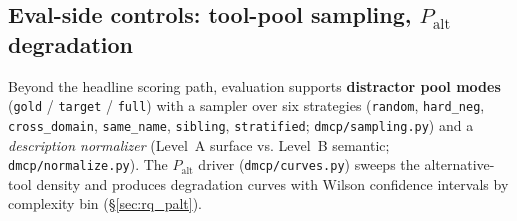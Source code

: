 \subsection{Eval-side controls: tool-pool sampling, $P_{\text{alt}}$ degradation}
\label{sec:method:controls}

Beyond the headline scoring path, evaluation supports \textbf{distractor
pool modes} (\texttt{gold} / \texttt{target} / \texttt{full}) with a
sampler over six strategies (\texttt{random}, \texttt{hard\_neg},
\texttt{cross\_domain}, \texttt{same\_name}, \texttt{sibling},
\texttt{stratified}; \texttt{dmcp/sampling.py}) and a \emph{description
normalizer} (Level~A surface vs. Level~B semantic;
\texttt{dmcp/normalize.py}). The $P_{\text{alt}}$ driver
(\texttt{dmcp/curves.py}) sweeps the alternative-tool density and
produces degradation curves with Wilson confidence intervals by
complexity bin (\S\ref{sec:rq_palt}).
